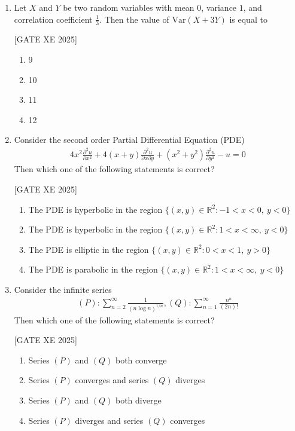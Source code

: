 \documentclass[journal,12pt,onecolumn]{IEEEtran}
\theoremstyle{remark}
\begin{document}
\begin{enumerate}
\item Let $X$ and $Y$ be two random variables with mean $0$, variance $1$, and correlation coefficient $\tfrac{1}{3}$.  
Then the value of $\text{Var}(X+3Y)$ is equal to

\hfill [GATE XE 2025]

\begin{multicols}{2}
\begin{enumerate}
\item 9
\item 10
\item 11
\item 12
\end{enumerate}
\end{multicols}

\item Consider the second order Partial Differential Equation (PDE)  
\begin{align}
    4x^2 \frac{\partial^2 u}{\partial x^2} + 4(x+y)\frac{\partial^2 u}{\partial x \partial y} + (x^2+y^2)\frac{\partial^2 u}{\partial y^2} - u = 0
\end{align} 
Then which one of the following statements is correct?

\hfill [GATE XE 2025]

\begin{multicols}{2}
\begin{enumerate}
\item The PDE is hyperbolic in the region $\{(x,y)\in\mathbb{R}^2 : -1 < x < 0, \ y < 0\}$
\item The PDE is hyperbolic in the region $\{(x,y)\in\mathbb{R}^2 : 1 < x < \infty, \ y < 0\}$
\item The PDE is elliptic in the region $\{(x,y)\in\mathbb{R}^2 : 0 < x < 1, \ y > 0\}$
\item The PDE is parabolic in the region $\{(x,y)\in\mathbb{R}^2 : 1 < x < \infty, \ y < 0\}$
\end{enumerate}
\end{multicols}

\item Consider the infinite series  
\begin{align}
    (P): \sum_{n=2}^{\infty} \frac{1}{(n \log n)^{1/n}},  (Q): \sum_{n=1}^{\infty} \frac{n^n}{(2n)!}
\end{align}
Then which one of the following statements is correct?

\hfill [GATE XE 2025]

\begin{multicols}{2}
\begin{enumerate}
\item Series $(P)$ and $(Q)$ both converge
\item Series $(P)$ converges and series $(Q)$ diverges
\item Series $(P)$ and $(Q)$ both diverge
\item Series $(P)$ diverges and series $(Q)$ converges
\end{enumerate}
\end{multicols}


\end{enumerate}
\end{document}
